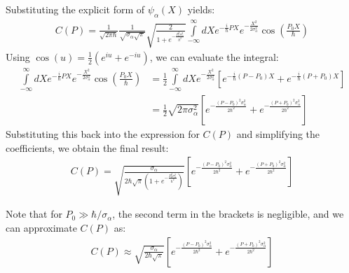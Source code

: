 Substituting the explicit form of $\psi_\alpha(X)$ yields:
\begin{align}
  C(P) = \frac{1}{\sqrt{2\pi\hbar}}\frac{1}{\sqrt{\sigma_\alpha\sqrt{\pi}}}\sqrt{\frac{2}{1+e^{-\frac{P_0^2\sigma_\alpha^2}{\hbar^2}}}}\int\limits_{-\infty}^{\infty}dX e^{-\frac{i}{\hbar}PX}e^{-\frac{X^2}{2\sigma_\alpha^2}}\cos\left(\frac{P_0 X}{\hbar}\right)
\end{align}
Using $\cos(u) = \frac{1}{2}(e^{iu} + e^{-iu})$, we can evaluate the integral:
\begin{align}
  \int\limits_{-\infty}^{\infty}dX e^{-\frac{i}{\hbar}PX}e^{-\frac{X^2}{2\sigma_\alpha^2}}\cos\left(\frac{P_0 X}{\hbar}\right) & = \frac{1}{2}\int\limits_{-\infty}^{\infty}dX e^{-\frac{X^2}{2\sigma_\alpha^2}}\left[ e^{-\frac{i}{\hbar}(P-P_0)X} + e^{-\frac{i}{\hbar}(P+P_0)X} \right] \nonumber \\
                                                                                                                               & = \frac{1}{2}\sqrt{2\pi\sigma_\alpha^2}\left[ e^{-\frac{(P-P_0)^2\sigma_\alpha^2}{2\hbar^2}} + e^{-\frac{(P+P_0)^2\sigma_\alpha^2}{2\hbar^2}} \right]
\end{align}
Substituting this back into the expression for $C(P)$ and simplifying the coefficients, we obtain the final result:
\begin{align}
  C(P) = \sqrt{\frac{\sigma_\alpha}{2\hbar\sqrt{\pi}\left(1+e^{-\frac{P_0^2\sigma_\alpha^2}{\hbar^2}}\right)}}\left[ e^{-\frac{(P-P_0)^2\sigma_\alpha^2}{2\hbar^2}} + e^{-\frac{(P+P_0)^2\sigma_\alpha^2}{2\hbar^2}} \right]\label{C(P)-one-atom}
\end{align}

Note that for $P_0 \gg \hbar/\sigma_\alpha$, the second term in the brackets is negligible, and we can approximate $C(P)$ as:
\begin{align}
  C(P) \approx \sqrt{\frac{\sigma_\alpha}{2\hbar\sqrt{\pi}}}\left[ e^{-\frac{(P-P_0)^2\sigma_\alpha^2}{2\hbar^2}}+ e^{-\frac{(P+P_0)^2\sigma_\alpha^2}{2\hbar^2}} \right]\label{C(P)-one-atom-approx}
\end{align}

